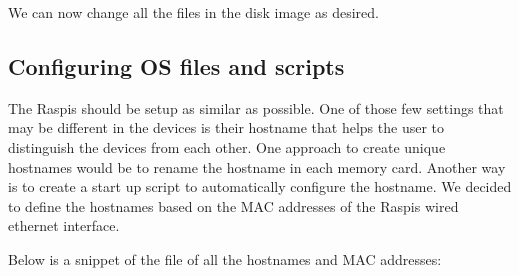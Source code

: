 We can now change all the files in the disk image as desired.



\subsection{Configuring OS files and scripts}

The \ac{Raspi}s should be setup as similar as possible. One of those
few settings that may be different in the devices is their hostname that
helps the user to distinguish the devices from each other.
One approach to create unique hostnames would be to rename the hostname
in each memory card. Another way is to create a start up script to automatically
configure the hostname. We decided to define the hostnames based on the \ac{MAC}
addresses of the \ac{Raspi}s wired ethernet interface.

%


Below is a snippet of the file of all the hostnames and \ac{MAC} addresses:



